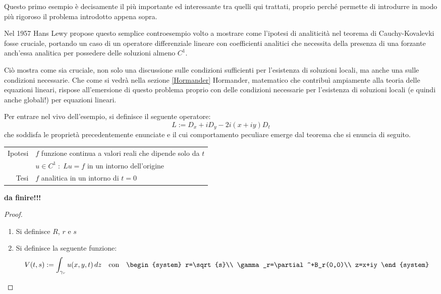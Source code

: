 \begin{example}
Questo primo esempio è decisamente il più importante ed interessante tra quelli qui trattati, 
proprio perché permette di introdurre in modo più rigoroso il problema introdotto appena sopra.

Nel 1957 Hans Lewy propose questo semplice controesempio volto a mostrare come l'ipotesi di analiticità nel teorema di 
Cauchy-Kovalevki fosse cruciale, portando un caso di un operatore differenziale lineare con coefficienti analitici che necessita 
della presenza di una forzante anch'essa analitica per possedere delle soluzioni almeno $C^1$.

Ciò mostra come sia cruciale, non solo una discussione sulle condizioni sufficienti per l'esistenza di soluzioni locali, 
ma anche una sulle condizioni necessarie. Che come si vedrà nella sezione \ref{Hormander} Hormander, 
matematico che contribuì ampiamente alla teoria delle equazioni lineari, 
rispose all'emersione di questo problema proprio con delle condizioni necessarie per l'esistenza di soluzioni locali 
(e quindi anche globali!) per equazioni lineari.

Per entrare nel vivo dell'esempio, si definisce il seguente operatore:
$$L:=D_x+iD_y-2i(x+iy)D_t$$
che soddisfa le proprietà precedentemente enunciate e il cui comportamento peculiare emerge dal teorema che si enuncia di seguito.
\begin{theorem}
\begin{tabular}{r|l}
Ipotesi & $f$ funzione continua a valori reali che dipende solo da $t$\\
&$u\in C^1\;:\;Lu=f$ in un intorno dell'origine\\
Tesi & $f$ analitica in un intorno di $t=0$
\end{tabular}
\end{theorem}

\textbf{da finire!!!}
\begin{proof}
\begin{enumerate}[1.]
\item
Si definisce $R$, $r$ e $s$
\item
Si definisce la seguente funzione: 
\begin{equation*}
V(t,s):=\int_{\gamma_r}u(x,y,t) \, dz \quad \text{con} \quad
\begin{system}
r=\sqrt{s}\\
\gamma_r=\partial^+B_r(0,0)\\
z=x+iy
\end{system}
\end{equation*}



\end{enumerate}
\end{proof}
\end{example}
